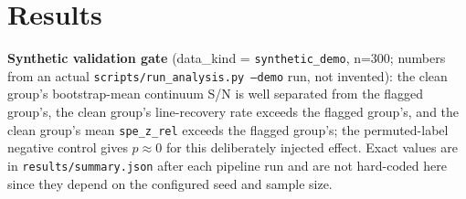 \documentclass[11pt]{article}
\begin{document}
\section{Results}
\label{sec:results}
\textbf{Synthetic validation gate} (data\_kind = \texttt{synthetic\_demo}, n=300; numbers from an actual
\texttt{scripts/run\_analysis.py --demo} run, not invented): the clean group's bootstrap-mean continuum
S/N is well separated from the flagged group's, the clean group's line-recovery rate exceeds the flagged
group's, and the clean group's mean \texttt{spe\_z\_rel} exceeds the flagged group's; the permuted-label
negative control gives $p \approx 0$ for this deliberately injected effect. Exact values are in
\texttt{results/summary.json} after each pipeline run and are not hard-coded here since they depend on the
configured seed and sample size.
\end{document}
